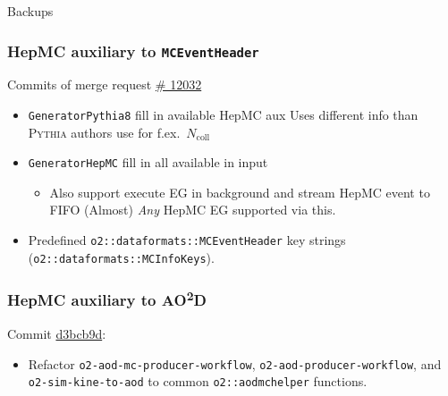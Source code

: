 \documentclass[compress,table,8pt]{beamer}
\newcommand\AOD{AO\textsuperscript{2}D}
\newcommand\Pythia{{\scshape Pythia}}
\begin{document}
\begin{frame}
  \vfill
  {\Huge Backups}\\[2ex]
  \vfill
\end{frame}

\begin{frame}
  \frametitle{HepMC auxiliary to \texttt{MCEventHeader}}

  {Commits of merge request \alert{\href{https://github.com/AliceO2Group/AliceO2/pull/12032/commits}{\# 12032}}}
  
  \begin{itemize}[<+->]
  \item \texttt{GeneratorPythia8} fill in available HepMC aux\newline
    {\footnotesize Uses different info than \Pythia{} authors use for
      f.ex.~$N_{\mathrm{coll}}$}
  \item \texttt{GeneratorHepMC} fill in all available in input
    \begin{itemize}
    \item Also support execute EG in background and stream HepMC event
      to FIFO\newline
      (Almost) \emph{Any} HepMC EG supported via this.
    \end{itemize}
  \item Predefined \texttt{o2::dataformats::MCEventHeader} key strings
    (\texttt{o2::dataformats::MCInfoKeys}).
  \end{itemize}

\end{frame}

\begin{frame}
  \frametitle{HepMC auxiliary to \AOD{}}

  {Commit
    \alert{\href{https://github.com/AliceO2Group/AliceO2/commit/d3bcb9d5c98a14618e100c4d476103b8f5989ae1}{d3bcb9d}}}:

  \begin{itemize}[<+->]
  \item Refactor \texttt{o2-aod-mc-producer-workflow},
    \texttt{o2-aod-producer-workflow}, and \texttt{o2-sim-kine-to-aod}
    to common \texttt{o2::aodmchelper} functions.
  \end{itemize}

\end{frame}
\end{document}
